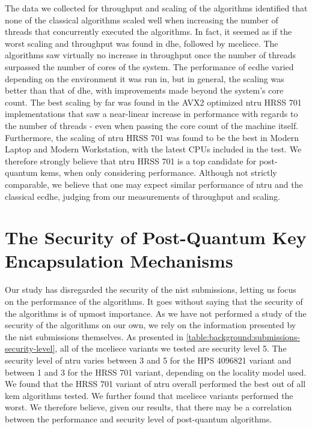 The data we collected for throughput and scaling of the algorithms identified that none of the classical algorithms scaled well when increasing the number of threads that concurrently executed the algorithms. In fact, it seemed as if the worst scaling and throughput was found in \gls{dhe}, followed by \gls{mceliece}. The algorithms saw virtually no increase in throughput once the number of threads surpassed the number of cores of the system. The performance of \gls{ecdhe} varied depending on the environment it was run in, but in general, the scaling was better than that of \gls{dhe}, with improvements made beyond the system's core count. The best scaling by far was found in the AVX2 optimized \gls{ntru} HRSS 701 implementations that saw a near-linear increase in performance with regards to the number of threads - even when passing the core count of the machine itself. Furthermore, the scaling of \gls{ntru} HRSS 701 was found to be the best in Modern Laptop and Modern Workstation, with the latest CPUs included in the test. We therefore strongly believe that \gls{ntru} HRSS 701 is a top candidate for \gls{post-quantum} \glspl{kem}, when only considering performance. Although not strictly comparable, we believe that one may expect similar performance of \gls{ntru} and the classical \gls{ecdhe}, judging from our measurements of throughput and scaling.


\section{The Security of Post-Quantum Key Encapsulation Mechanisms}
\label{section:discussion:post-quantum-security}

Our study has disregarded the security of the \gls{nist} submissions, letting us focus on the performance of the algorithms. It goes without saying that the security of the algorithms is of upmost importance. As we have not performed a study of the security of the algorithms on our own, we rely on the information presented by the \gls{nist} submissions themselves. As presented in \ref{table:background:submissions-security-level}, all of the \gls{mceliece} variants we tested are security level 5. The security level of \gls{ntru} varies between 3 and 5 for the HPS 4096821 variant and between 1 and 3 for the HRSS 701 variant, depending on the locality model used. We found that the HRSS 701 variant of \gls{ntru} overall performed the best out of all \gls{kem} algorithms tested. We further found that \gls{mceliece} variants performed the worst. We therefore believe, given our results, that there may be a correlation between the performance and security level of \gls{post-quantum} algorithms.

